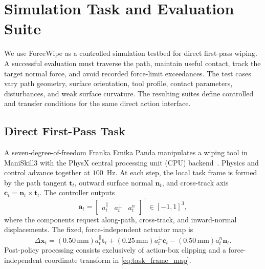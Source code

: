 \providecommand{\Ftgt}{F^{\star}}
\providecommand{\Fmin}{F_{\min}}
\providecommand{\Fmax}{F_{\max}}
\providecommand{\Faud}{F^{\mathrm{aud}}}
\providecommand{\ind}{\mathbb{I}}

\section{Simulation Task and Evaluation Suite}
\label{sec:benchmark}

We use ForceWipe as a controlled simulation testbed for direct first-pass
wiping. A successful evaluation must traverse the path, maintain useful
contact, track the target normal force, and avoid recorded force-limit
exceedances. The test cases vary path geometry, surface orientation, tool
profile, contact parameters, disturbances, and weak surface curvature. The
resulting suites define controlled and transfer conditions for the same direct
action interface.

\subsection{Direct First-Pass Task}
\label{subsec:task}

A seven-degree-of-freedom Franka Emika Panda manipulates a wiping tool in
ManiSkill3 with the PhysX central processing unit (CPU)
backend~\cite{xiang2020sapien,c_maniskill}.
Physics and control advance together at $100$~Hz. At each step, the local task
frame is formed by the path tangent $\mathbf{t}_t$, outward surface normal
$\mathbf{n}_t$, and cross-track axis
$\mathbf{c}_t=\mathbf{n}_t\times\mathbf{t}_t$. The controller outputs
\begin{equation}
\mathbf{a}_t=
\begin{bmatrix}a_t^{\parallel}&a_t^{\perp}&a_t^{n}\end{bmatrix}^{\!\top}
\in[-1,1]^3,
\label{eq:direct_action}
\end{equation}
where the components request along-path, cross-track, and inward-normal
displacements. The fixed, force-independent actuator map is
\begin{equation}
\Delta\mathbf{x}_t=
(0.50\,\mathrm{mm})a_t^{\parallel}\mathbf{t}_t
+(0.25\,\mathrm{mm})a_t^{\perp}\mathbf{c}_t
-(0.50\,\mathrm{mm})a_t^{n}\mathbf{n}_t.
\label{eq:task_frame_map}
\end{equation}
Post-policy processing consists exclusively of action-box clipping and a
force-independent coordinate transform in \eqref{eq:task_frame_map}.

